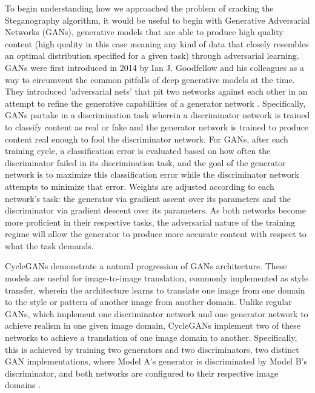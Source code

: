 \documentclass[conference]{IEEEtran}
\begin{document}
To begin understanding how we approached the problem of cracking the Steganography algorithm, it would be useful to begin with Generative Adversarial Networks (GANs), generative models that are able to produce high quality content (high quality in this case meaning any kind of data that closely resembles an optimal distribution specified for a given task) through adversarial learning. GANs were first introduced in 2014 by Ian J. Goodfellow and his colleagues as a way to circumvent the common pitfalls of deep generative models at the time. They introduced 'adversarial nets' that pit two networks against each other in an attempt to refine the generative capabilities of a generator network \cite{goodfellow_generative_2014}. Specifically, GANs partake in a discrimination task wherein a discriminator network is trained to classify content as real or fake and the generator network is trained to produce content real enough to fool the discriminator network. For GANs, after each training cycle, a classification error is evaluated based on how often the discriminator failed in its discrimination task, and the goal of the generator network is to maximize this classification error while the discriminator network attempts to minimize that error. Weights are adjusted according to each network's task: the generator via gradient ascent over its parameters and the discriminator via gradient descent over its parameters. \cite{radford_unsupervised_2016, paloniemi_introduction_2020} As both networks become more proficient in their respective tasks, the adversarial nature of the training regime will allow the generator to produce more accurate content with respect to what the task demands.  

CycleGANs demonstrate a natural progression of GANs architecture. These models are useful for image-to-image translation, commonly implemented as style transfer, wherein the architecture learns to translate one image from one domain to the style or pattern of another image from another domain. Unlike regular GANs, which implement one discriminator network and one generator network to achieve realism in one given image domain, CycleGANs implement two of these networks to achieve a translation of one image domain to another. Specifically, this is achieved by training two generators and two discriminators, two distinct GAN implementations, where Model A's generator is discriminated by Model B's discriminator, and both networks are configured to their respective image domains \cite{chu_cyclegan_2017}.
\end{document}
